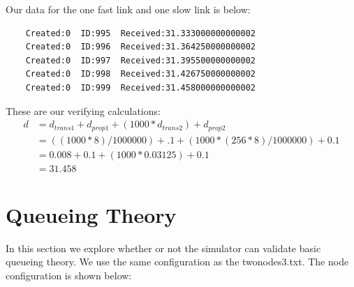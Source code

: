 \documentclass[fleqn,11pt]{article}
\begin{document}
\begin{enumerate}
  Our data for the one fast link and one slow link is below: 
  \begin{lstlisting}
    Created:0  ID:995  Received:31.333000000000002
    Created:0  ID:996  Received:31.364250000000002
    Created:0  ID:997  Received:31.395500000000002
    Created:0  ID:998  Received:31.426750000000002
    Created:0  ID:999  Received:31.458000000000002
  \end{lstlisting}
  These are our verifying calculations:
  \begin{align*}
    d &= d_{trans1} + d_{prop1} + (1000 * d_{trans2}) + d_{prop2}\\
      &= ((1000*8)/1000000) + .1 + (1000 * (256*8)/1000000) + 0.1\\
      &= 0.008 + 0.1 + (1000 * 0.03125) + 0.1\\
      &= 31.458
  \end{align*}

\end{enumerate}



\section{Queueing Theory}
In this section we explore whether or not the simulator can validate basic queueing theory. 
We use the same configuration as the twonodes3.txt. 
\newline
\newline
The node configuration is shown below:
\newline

\end{document}
